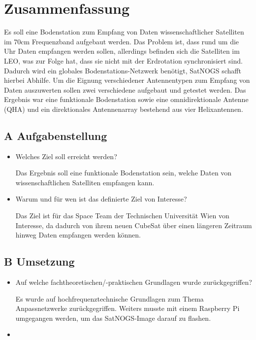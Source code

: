 \section*{Zusammenfassung}
Es soll eine Bodenstation zum Empfang von Daten wissenschaftlicher Satelliten im 70cm Frequenzband aufgebaut werden. Das Problem ist, dass rund um die Uhr Daten empfangen werden sollen, allerdings befinden sich die Satelliten im LEO, was zur Folge hat, dass sie nicht mit der Erdrotation synchronisiert sind. Dadurch wird ein globales Bodenstations-Netzwerk benötigt, SatNOGS schafft hierbei Abhilfe.
Um die Eignung verschiedener Antennentypen zum Empfang von Daten auszuwerten sollen zwei verschiedene aufgebaut und getestet werden.
Das Ergebnis war eine funktionale Bodenstation sowie eine omnidirektionale Antenne (QHA) und ein direktionales Antennenarray bestehend aus vier Helixantennen.

\subsection*{A Aufgabenstellung}
\begin{itemize}	
	\item Welches Ziel soll erreicht werden?
	
	Das Ergebnis soll eine funktionale Bodenstation sein, welche Daten von wissenschaftlichen Satelliten empfangen kann.
	
	\item Warum und für wen ist das definierte Ziel von Interesse?
	
	Das Ziel ist für das Space Team der Technischen Universität Wien von Interesse, da dadurch von ihrem neuen CubeSat über einen längeren Zeitraum hinweg Daten empfangen werden können.
\end{itemize}

\subsection*{B Umsetzung}
\begin{itemize}
	\item Auf welche fachtheoretischen/-praktischen Grundlagen wurde zurückgegriffen?
	
	Es wurde auf hochfrequenztechnische Grundlagen zum Thema Anpassnetzwerke zurückgegriffen. Weiters musste mit einem Raspberry Pi umgegangen werden, um das SatNOGS-Image darauf zu flashen.
	
	\item 
\end{itemize}

